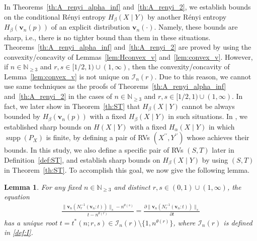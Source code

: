\documentclass[conference, draftcls, onecolumn]{IEEEtran}
\theoremstyle{plain}
\newtheorem{lemma}{Lemma}
\newcommand{\bvec}[1]{\boldsymbol{#1}}
\newcommand{\supp}{\operatorname{supp}}
\newcommand{\lemref}[1]{Lemma~\ref{#1}}
\newcommand{\thref}[1]{Theorem~\ref{#1}}
\newcommand{\defref}[1]{Definition~\ref{#1}}
\begin{document}
In Theorems~\ref{th:A_renyi_alpha_inf} and~\ref{th:A_renyi_2}, we establish bounds on the conditional R\'{e}nyi entropy $H_{\beta}(X \mid Y)$ by another R\'{e}nyi entropy $H_{\beta}(\bvec{v}_{n}( p ))$ of an explicit distribution $\bvec{v}_{n}( \cdot )$.
Namely, these bounds are sharp, i.e., there is no tighter bound than them in these situations.
Theorems~\ref{th:A_renyi_alpha_inf} and~\ref{th:A_renyi_2} are proved by using the convexity/concavity of Lemmas~\ref{lem:Hconvex_v} and~\ref{lem:convex_v}.
However, if $n \in \mathbb{N}_{\ge 3}$ and $r, s \in [1/2, 1) \cup (1, \infty)$, then the convexity/concavity of \lemref{lem:convex_v} is not unique on $\mathcal{I}_{n}( r )$.
Due to this reason, we cannot use same techniques as the proofs of Theorems~\ref{th:A_renyi_alpha_inf} and~\ref{th:A_renyi_2} in the cases of $n \in \mathbb{N}_{\ge 3}$ and $r, s \in [1/2, 1) \cup (1, \infty)$.
In fact, we later show in \thref{th:ST} that $H_{\beta}(X \mid Y)$ cannot be always bounded by $H_{\beta}(\bvec{v}_{n}( p ))$ with a fixed $H_{\beta}(X \mid Y)$ in such situations.
In \cite[Theorem~4 and Corollary~1]{part2}, we established sharp bounds on $H(X \mid Y)$ with a fixed $H_{\alpha}(X \mid Y)$ in which $\supp( P_{X} )$ is finite, by defining a pair of RVs $(X^{\prime\prime}, Y^{\prime\prime})$ \cite[Definition~2]{part2} whose achieves their bounds.
In this study, we also define a specific pair of RVs $(S, T)$ later in \defref{def:ST}, and establish sharp bounds on $H_{\beta}(X \mid Y)$ by using $(S, T)$ in \thref{th:ST}.
To accomplish this goal, we now give the following lemma.


\begin{lemma}
\label{lem:slope_v}
For any fixed $n \in \mathbb{N}_{\ge 3}$ and distinct $r, s \in (0, 1) \cup (1, \infty)$, the equation
\begin{align}
\frac{ \| \bvec{v}_{n}( N_{r}^{-1}( \bvec{v}_{n} : t )) \|_{s} - n^{\theta( s )} }{ t - n^{\theta( r )} }
=
\frac{ \partial \| \bvec{v}_{n}( N_{r}^{-1}( \bvec{v}_{n} : t ) ) \|_{s} }{ \partial t }
\label{eq:slope_v}
\end{align}
has a unique root $t = t^{\ast}(n; r, s) \in \mathcal{I}_{n}( r ) \setminus \{ 1, n^{\theta( r )} \}$, where $\mathcal{I}_{n}( r )$ is defined in \eqref{def:I}.
\end{lemma}
\end{document}
